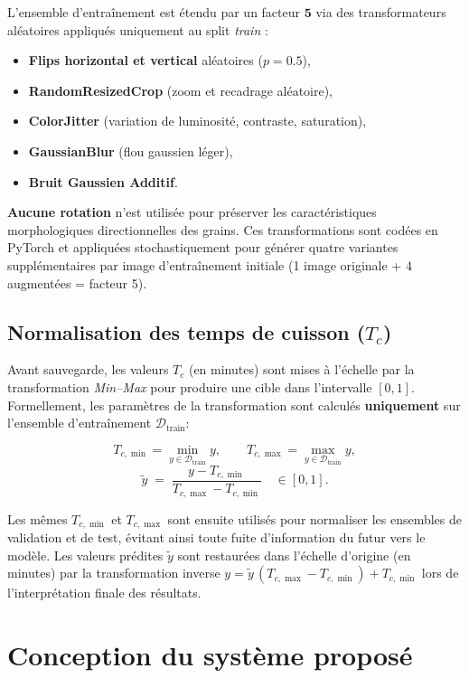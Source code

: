   L'ensemble d'entraînement est étendu par un facteur $\mathbf{5}$ via des transformateurs aléatoires appliqués uniquement au split \emph{train} :
  \begin{itemize}
      \item \textbf{Flips horizontal et vertical} aléatoires ($p=0.5$),
      \item \textbf{RandomResizedCrop} (zoom et recadrage aléatoire),
      \item \textbf{ColorJitter} (variation de luminosité, contraste, saturation),
      \item \textbf{GaussianBlur} (flou gaussien léger),
      \item \textbf{Bruit Gaussien Additif}.
  \end{itemize}
  \textbf{Aucune rotation} n'est utilisée pour préserver les caractéristiques morphologiques directionnelles des grains. Ces transformations sont codées en PyTorch et appliquées stochastiquement pour générer quatre variantes supplémentaires par image d'entraînement initiale (1 image originale + 4 augmentées = facteur 5).

  \subsection{Normalisation des temps de cuisson ($T_c$)}

  Avant sauvegarde, les valeurs $T_c$ (en minutes) sont mises à l'échelle par la transformation \emph{Min–Max} pour produire une cible dans l'intervalle $[0,1]$. Formellement, les paramètres de la transformation sont calculés \textbf{uniquement} sur l'ensemble d'entraînement $\mathcal{D}_{\text{train}}$:

  \[
  T_{c,\min} = \min_{y\in \mathcal{D}_{\text{train}}} y, \qquad
  T_{c,\max} = \max_{y\in \mathcal{D}_{\text{train}}} y,
  \]
  \[
  \tilde{y} \;=\; \frac{y - T_{c,\min}}{T_{c,\max} - T_{c,\min}} \quad\in[0,1].
  \]

  Les mêmes $T_{c,\min}$ et $T_{c,\max}$ sont ensuite utilisés pour normaliser les ensembles de validation et de test, évitant ainsi toute fuite d'information du futur vers le modèle. Les valeurs prédites $\tilde{y}$ sont restaurées dans l'échelle d'origine (en minutes) par la transformation inverse $y = \tilde{y}\,(T_{c,\max}-T_{c,\min}) + T_{c,\min}$ lors de l'interprétation finale des résultats.

  \section{Conception du système proposé}

